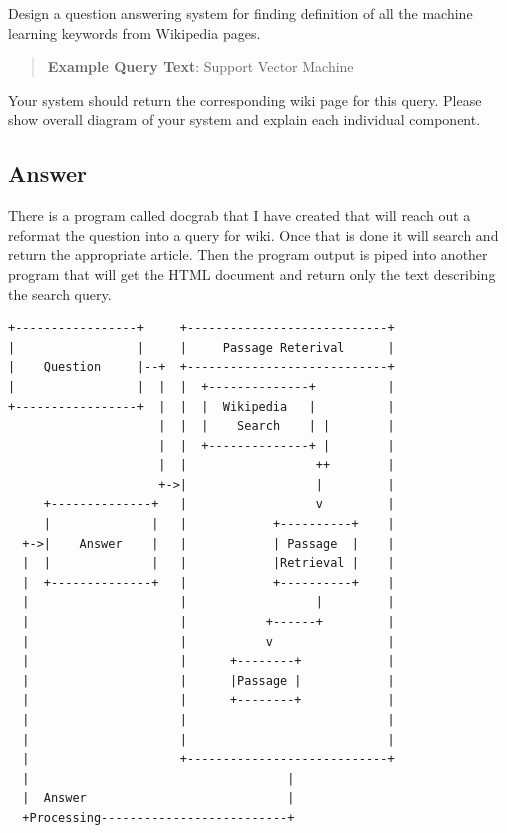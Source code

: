 Design a question answering system for finding definition of all the machine learning keywords from Wikipedia pages. 
\begin{quote}
	\textbf{Example Query Text}: Support Vector Machine
\end{quote}
Your system should return the corresponding wiki page for this query.
Please show overall diagram of your system and explain each individual component.

\subsection*{Answer}
There is a program called docgrab that I have created that will reach out a reformat the question into a query for wiki. 
Once that is done it will search and return the appropriate article. 
Then the program output is piped into another program that will get the HTML document and return only the text describing the search query.
\begin{verbatim}
+-----------------+     +----------------------------+
|                 |     |     Passage Reterival      |
|    Question     |--+  +----------------------------+
|                 |  |  |  +--------------+          |
+-----------------+  |  |  |  Wikipedia   |          |
                     |  |  |    Search    | |        |
                     |  |  +--------------+ |        |
                     |  |                  ++        |
                     +->|                  |         |
     +--------------+   |                  v         |
     |              |   |            +----------+    |
  +->|    Answer    |   |            | Passage  |    |
  |  |              |   |            |Retrieval |    |
  |  +--------------+   |            +----------+    |
  |                     |                  |         |
  |                     |           +------+         |
  |                     |           v                |
  |                     |      +--------+            |
  |                     |      |Passage |            |
  |                     |      +--------+            |
  |                     |                            |
  |                     |                            |
  |                     +----------------------------+
  |                                    |
  |  Answer                            |
  +Processing--------------------------+
                                                      
\end{verbatim}
